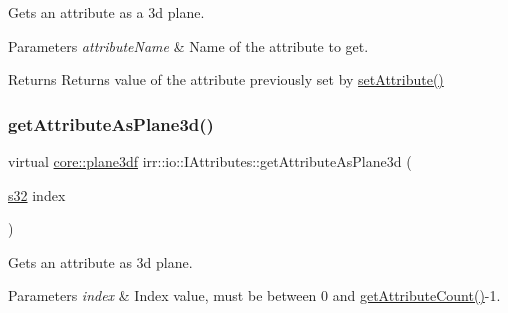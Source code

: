 Gets an attribute as a 3d plane. 


\begin{DoxyParams}{Parameters}
{\em attribute\+Name} & Name of the attribute to get. \\
\hline
\end{DoxyParams}
\begin{DoxyReturn}{Returns}
Returns value of the attribute previously set by \hyperlink{classirr_1_1io_1_1IAttributes_a03fa31acb481ae23678676cc183f09a6}{set\+Attribute()} 
\end{DoxyReturn}
\mbox{\label{classirr_1_1io_1_1IAttributes_adcb6bc5b7d76f8299b587b34b7dfaeee}} 
\subsubsection{\texorpdfstring{get\+Attribute\+As\+Plane3d()}{getAttributeAsPlane3d()}\hspace{0.1cm}{\footnotesize\ttfamily [2/2]}}
{\footnotesize\ttfamily virtual \hyperlink{namespaceirr_1_1core_ae7491b7985dcb74b840bfcd9c054b232}{core\+::plane3df} irr\+::io\+::\+I\+Attributes\+::get\+Attribute\+As\+Plane3d (\begin{DoxyParamCaption}\item[{\hyperlink{namespaceirr_ac66849b7a6ed16e30ebede579f9b47c6}{s32}}]{index }\end{DoxyParamCaption})\hspace{0.3cm}{\ttfamily [pure virtual]}}



Gets an attribute as 3d plane. 


\begin{DoxyParams}{Parameters}
{\em index} & Index value, must be between 0 and \hyperlink{classirr_1_1io_1_1IAttributes_a796bdd9440ee7ba0b6742a90a82870b6}{get\+Attribute\+Count()}-\/1. \\
\hline
\end{DoxyParams}
\mbox{\label{classirr_1_1io_1_1IAttributes_abedde01b678c482be20735e4d730942f}} 
